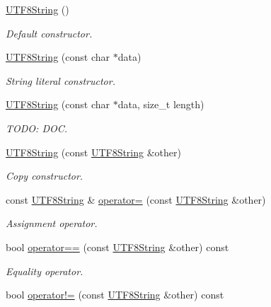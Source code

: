 \begin{DoxyCompactItemize}
\item 
\hyperlink{classchaos_1_1str_1_1_u_t_f8_string_a173513bf2d62d742bee337b00716bf82}{U\-T\-F8\-String} ()
\begin{DoxyCompactList}\small\item\em Default constructor. \end{DoxyCompactList}\item 
\hyperlink{classchaos_1_1str_1_1_u_t_f8_string_af506696bfe777057c4a7e6b6acf19dab}{U\-T\-F8\-String} (const char $\ast$data)
\begin{DoxyCompactList}\small\item\em String literal constructor. \end{DoxyCompactList}\item 
\hyperlink{classchaos_1_1str_1_1_u_t_f8_string_ac3077c0963a5f36dcaa2a87a1c02d05d}{U\-T\-F8\-String} (const char $\ast$data, size\-\_\-t length)
\begin{DoxyCompactList}\small\item\em T\-O\-D\-O\-: D\-O\-C. \end{DoxyCompactList}\item 
\hyperlink{classchaos_1_1str_1_1_u_t_f8_string_a194b76859245fdb815ce5d537f2e1db4}{U\-T\-F8\-String} (const \hyperlink{classchaos_1_1str_1_1_u_t_f8_string}{U\-T\-F8\-String} \&other)
\begin{DoxyCompactList}\small\item\em Copy constructor. \end{DoxyCompactList}\item 
const \hyperlink{classchaos_1_1str_1_1_u_t_f8_string}{U\-T\-F8\-String} \& \hyperlink{classchaos_1_1str_1_1_u_t_f8_string_a050b804cc8978a4a55a5bc0a8cad2553}{operator=} (const \hyperlink{classchaos_1_1str_1_1_u_t_f8_string}{U\-T\-F8\-String} \&other)
\begin{DoxyCompactList}\small\item\em Assignment operator. \end{DoxyCompactList}\item 
bool \hyperlink{classchaos_1_1str_1_1_u_t_f8_string_ae4446150398d498e8aa9ebbc05ca7b52}{operator==} (const \hyperlink{classchaos_1_1str_1_1_u_t_f8_string}{U\-T\-F8\-String} \&other) const 
\begin{DoxyCompactList}\small\item\em Equality operator. \end{DoxyCompactList}\item 
bool \hyperlink{classchaos_1_1str_1_1_u_t_f8_string_a166394399a4d200494b40e034aa330da}{operator!=} (const \hyperlink{classchaos_1_1str_1_1_u_t_f8_string}{U\-T\-F8\-String} \&other) const 

\end{DoxyCompactItemize}
